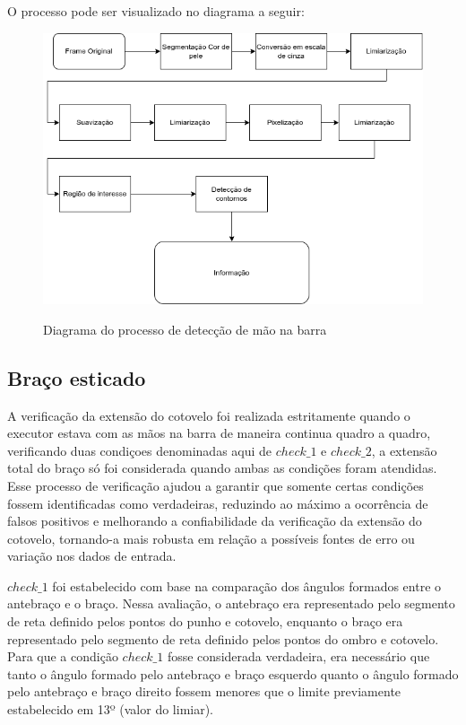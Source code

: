 O processo pode ser visualizado no diagrama a seguir:
\begin{figure}[H]
	\centering
    \caption{Diagrama do processo de detecção de mão na barra}
	\includegraphics[scale=0.7]{figuras/diagrama/mao_barra.png}
	\label{dia:mao_barra}
\end{figure}

\subsection[Braço esticado]{Braço esticado}\label{sec:Braco esticado}

A verificação da extensão do cotovelo foi realizada estritamente quando o executor estava com as mãos na barra de maneira continua quadro a quadro, verificando duas condiçoes denominadas aqui de $check\_1$ e $check\_2$, a extensão total do braço só foi considerada quando ambas as condições foram atendidas. Esse processo de verificação ajudou a garantir que somente certas condições fossem identificadas como verdadeiras, reduzindo ao máximo a ocorrência de falsos positivos e melhorando a confiabilidade da verificação da extensão do cotovelo, tornando-a mais robusta em relação a possíveis fontes de erro ou variação nos dados de entrada.


$check\_1$ foi estabelecido com base na comparação dos ângulos formados entre o antebraço e o braço. Nessa avaliação, o antebraço era representado pelo segmento de reta definido pelos pontos do punho e cotovelo, enquanto o braço era representado pelo segmento de reta definido pelos pontos do ombro e cotovelo. Para que a condição $check\_1$ fosse considerada verdadeira, era necessário que tanto o ângulo formado pelo antebraço e braço esquerdo quanto o ângulo formado pelo antebraço e braço direito fossem menores que o limite previamente estabelecido em 13º (valor do limiar).\label{angulo_braco}

